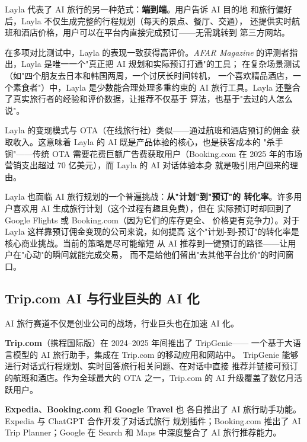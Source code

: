 Layla 代表了 AI 旅行的另一种范式：\textbf{端到端}。用户告诉 AI 目的地
和旅行偏好后，Layla 不仅生成完整的行程规划（每天的景点、餐厅、交通），
还提供实时航班和酒店价格，用户可以在平台内直接完成预订——无需跳转到
第三方网站。

在多项对比测试中，Layla 的表现一致获得高评价。\textit{AFAR Magazine}
的评测者指出，Layla 是唯一一个"真正把 AI 规划和实际预订打通"的工具；
在复杂场景测试（如"四个朋友去日本和韩国两周，一个讨厌长时间转机，
一个喜欢精品酒店，一个素食者"）中，Layla 是少数能合理处理多重约束的
AI 旅行工具。Layla 还整合了真实旅行者的经验和评价数据，让推荐不仅基于
算法，也基于"去过的人怎么说"。

Layla 的变现模式与 OTA（在线旅行社）类似——通过航班和酒店预订的佣金
获取收入。这意味着 Layla 的 AI 既是产品体验的核心，也是获客成本的
"杀手锏"——传统 OTA 需要花费巨额广告费获取用户（Booking.com 在
2025 年的市场营销支出超过 70 亿美元），而 Layla 的 AI 对话体验本身
就是吸引用户回来的理由。

Layla 也面临 AI 旅行规划的一个普遍挑战：\textbf{从"计划"到"预订"的
转化率}。许多用户喜欢用 AI 生成旅行计划（这个过程有趣且免费），但在
实际预订时却回到了 Google Flights 或 Booking.com（因为它们的库存更全、
价格更有竞争力）。对于 Layla 这样靠预订佣金变现的公司来说，如何提高
这个"计划-到-预订"的转化率是核心商业挑战。当前的策略是尽可能缩短
从 AI 推荐到一键预订的路径——让用户在"心动"的瞬间就能完成交易，
而不是给他们留出"去其他平台比价"的时间窗口。


\subsection{Trip.com AI 与行业巨头的 AI 化}
\label{subsec:tripcom}

AI 旅行赛道不仅是创业公司的战场，行业巨头也在加速 AI 化。

\textbf{Trip.com}（携程国际版）在 2024--2025 年间推出了 TripGenie——
一个基于大语言模型的 AI 旅行助手，集成在 Trip.com 的移动应用和网站中。
TripGenie 能够进行对话式行程规划、实时回答旅行相关问题、在对话中直接
推荐并链接可预订的航班和酒店。作为全球最大的 OTA 之一，Trip.com 的
AI 升级覆盖了数亿月活跃用户。

\textbf{Expedia}、\textbf{Booking.com} 和 \textbf{Google Travel} 也
各自推出了 AI 旅行助手功能。Expedia 与 ChatGPT 合作开发了对话式旅行
规划插件；Booking.com 推出了 AI Trip Planner；Google 在 Search 和 Maps
中深度整合了 AI 旅行推荐能力。

